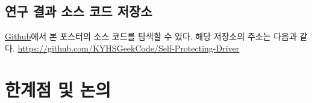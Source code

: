 \documentclass{tudelftposter}
\begin{document}
\subsection{연구 결과 소스 코드 저장소}
\href{https://github.com/KYHSGeekCode/Self-Protecting-Driver}{Github}에서 본 포스터의 소스 코드를 탐색할 수 있다. 해당 저장소의 주소는 다음과 같다.
\href{https://github.com/KYHSGeekCode/Self-Protecting-Driver}{https://github.com/KYHSGeekCode/Self-Protecting-Driver}

\section{한계점 및 논의}
\end{document}
